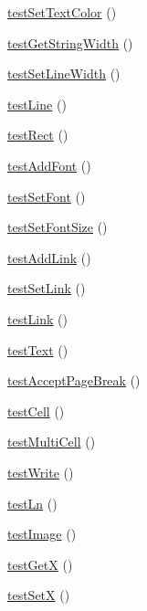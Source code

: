 \begin{DoxyCompactItemize}
\item 
\hyperlink{class_f_p_d_f_test_a91acaaf45bf68b9129756e7618de4683}{testSetTextColor} ()
\item 
\hyperlink{class_f_p_d_f_test_ab49ba3bd8551059cea48f2929b32b61a}{testGetStringWidth} ()
\item 
\hyperlink{class_f_p_d_f_test_a1c589e119a8e5cf461248b101e3c77af}{testSetLineWidth} ()
\item 
\hyperlink{class_f_p_d_f_test_a984a4f0a8b6f12f1cc2474fc0561051f}{testLine} ()
\item 
\hyperlink{class_f_p_d_f_test_a1d7b051b0fc343e9aea5c7add0f50079}{testRect} ()
\item 
\hyperlink{class_f_p_d_f_test_aa7c6ae9047be47e7b38c0fbf52dd8619}{testAddFont} ()
\item 
\hyperlink{class_f_p_d_f_test_a36bed25ac66224faa8a65bc191926ce1}{testSetFont} ()
\item 
\hyperlink{class_f_p_d_f_test_aa1aac326b42884a53ded3b4225a6a9bc}{testSetFontSize} ()
\item 
\hyperlink{class_f_p_d_f_test_a1895a422f29864b8ed7323e150ed15ee}{testAddLink} ()
\item 
\hyperlink{class_f_p_d_f_test_a289ccd19029ec26d4e311f4d650128ca}{testSetLink} ()
\item 
\hyperlink{class_f_p_d_f_test_aef6ea3b0fc374fd6b25b7bec89e83255}{testLink} ()
\item 
\hyperlink{class_f_p_d_f_test_a4d2fe44ceafdc76f64d18989cb664187}{testText} ()
\item 
\hyperlink{class_f_p_d_f_test_aacd187932d4ba95945d7368040b0b0f9}{testAcceptPageBreak} ()
\item 
\hyperlink{class_f_p_d_f_test_af8b8cbe99bd1f70247bcac12267a7356}{testCell} ()
\item 
\hyperlink{class_f_p_d_f_test_abb35a3a6e26a7be6e12ad78283fe7a11}{testMultiCell} ()
\item 
\hyperlink{class_f_p_d_f_test_a410c55a6fc67eb3b2d96573abafb4250}{testWrite} ()
\item 
\hyperlink{class_f_p_d_f_test_a8b6fbb3c5a332ae647f623fd783b54cf}{testLn} ()
\item 
\hyperlink{class_f_p_d_f_test_aab701e9639f8d39a44e7119e5f977d3f}{testImage} ()
\item 
\hyperlink{class_f_p_d_f_test_a728a3a25024a1c747d2ebe02263d946e}{testGetX} ()
\item 
\hyperlink{class_f_p_d_f_test_a5a6004c3fde570d963d892ee4dc0b4e7}{testSetX} ()
\item 

\end{DoxyCompactItemize}
